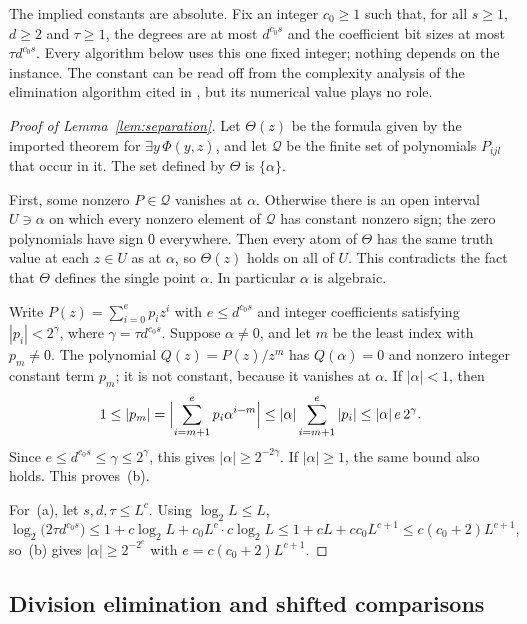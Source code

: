The implied constants are absolute. Fix an integer $c_0\ge1$ such that, for
all $s\ge1$, $d\ge2$ and $\tau\ge1$, the degrees are at most $d^{c_0s}$ and
the coefficient bit sizes at most $\tau d^{c_0s}$. Every algorithm below uses
this one fixed integer; nothing depends on the instance. The constant can be
read off from the complexity analysis of the elimination algorithm cited in
\citet{Basu2014}, but its numerical value plays no role.

\begin{proof}[Proof of Lemma~\ref{lem:separation}]
Let $\Theta(z)$ be the formula given by the imported theorem for
$\exists y\,\Phi(y,z)$, and let $\mathcal Q$ be the finite set of
polynomials $P_{ijl}$ that occur in it. The set defined by $\Theta$ is
$\{\alpha\}$.

First, some nonzero $P\in\mathcal Q$ vanishes at $\alpha$. Otherwise there is
an open interval $U\ni\alpha$ on which every nonzero element of $\mathcal Q$
has constant nonzero sign; the zero polynomials have sign $0$ everywhere.
Then every atom of $\Theta$ has the same truth value at each $z\in U$ as at
$\alpha$, so $\Theta(z)$ holds on all of $U$. This contradicts the fact that
$\Theta$ defines the single point $\alpha$. In particular $\alpha$ is
algebraic.

Write $P(z)=\sum_{i=0}^ep_iz^i$ with $e\le d^{c_0s}$ and integer
coefficients satisfying $|p_i|<2^\gamma$, where $\gamma=\tau d^{c_0s}$.
Suppose $\alpha\ne0$, and let $m$ be the least index with $p_m\ne0$. The
polynomial $Q(z)=P(z)/z^m$ has $Q(\alpha)=0$ and nonzero integer constant
term $p_m$; it is not constant, because it vanishes at $\alpha$. If
$|\alpha|<1$, then
\[
 1\le|p_m|=\Bigl|\sum_{i=m+1}^ep_i\alpha^{i-m}\Bigr|
 \le|\alpha|\sum_{i=m+1}^e|p_i|\le|\alpha|\,e\,2^\gamma .
\]
Since $e\le d^{c_0s}\le\gamma\le2^\gamma$, this gives
$|\alpha|\ge2^{-2\gamma}$. If $|\alpha|\ge1$, the same bound also holds.
This proves~(b).

For~(a), let $s,d,\tau\le L^c$. Using $\log_2L\le L$,
\[
 \log_2\bigl(2\tau d^{c_0s}\bigr)
 \le1+c\log_2L+c_0L^c\cdot c\log_2L
 \le1+cL+cc_0L^{c+1}\le c(c_0+2)L^{c+1},
\]
so~(b) gives $|\alpha|\ge2^{-2^e}$ with $e=c(c_0+2)L^{c+1}$.
\end{proof}

\subsection{Division elimination and shifted comparisons}
\label{app:upper-clearing}

